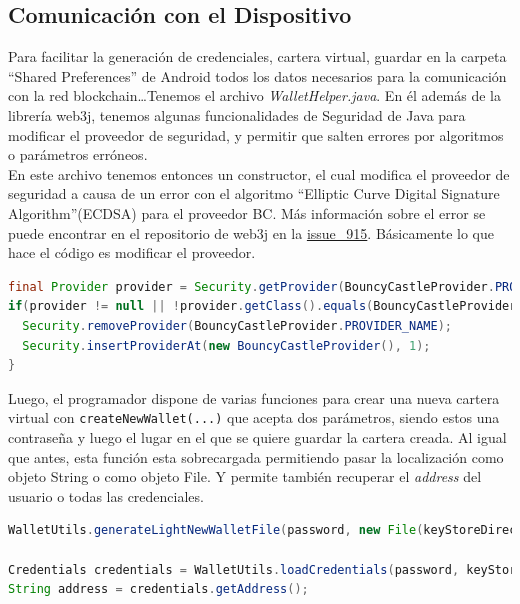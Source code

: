 \subsection{Comunicación con el Dispositivo}

Para facilitar la generación de credenciales, cartera virtual, guardar en la carpeta ``Shared Preferences'' de Android todos los datos necesarios para la comunicación con la red blockchain\dots Tenemos el archivo \emph{WalletHelper.java}. En él además de la librería web3j, tenemos algunas funcionalidades de Seguridad de Java para modificar el proveedor de seguridad, y permitir que salten errores por algoritmos o parámetros erróneos. \\

En este archivo tenemos entonces un constructor, el cual modifica el proveedor de seguridad a causa de un error con el algoritmo ``Elliptic Curve Digital Signature Algorithm''(ECDSA)\cite{ecdsa} para el proveedor BC\cite{bc}. Más información sobre el error se puede encontrar en el repositorio de web3j en la \href{https://github.com/web3j/web3j/issues/915}{issue\_915}. Básicamente lo que hace el código es modificar el proveedor.

\begin{lstlisting}[language=Java,float=ht,caption={[Java] Modificación de proveedor de seguridad},label=lst:transactionHelper]
final Provider provider = Security.getProvider(BouncyCastleProvider.PROVIDER_NAME);
if(provider != null || !provider.getClass().equals(BouncyCastleProvider.class)){
  Security.removeProvider(BouncyCastleProvider.PROVIDER_NAME);
  Security.insertProviderAt(new BouncyCastleProvider(), 1);
}
\end{lstlisting}

Luego, el programador dispone de varias funciones para crear una nueva cartera virtual con \verb|createNewWallet(...)| que acepta dos parámetros, siendo estos una contraseña y luego el lugar en el que se quiere guardar la cartera creada. Al igual que antes, esta función esta sobrecargada permitiendo pasar la localización como objeto String o como objeto File. Y permite también recuperar el \emph{address} del usuario o todas las credenciales. 

\begin{lstlisting}[language=Java,float=ht,caption={[Java] Creacion de wallet y recuperación del address},label=lst:transactionHelper]
WalletUtils.generateLightNewWalletFile(password, new File(keyStoreDirectory));

Credentials credentials = WalletUtils.loadCredentials(password, keyStoreDirectory);
String address = credentials.getAddress();
\end{lstlisting}

